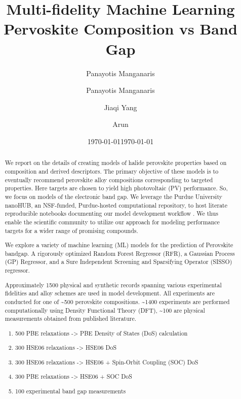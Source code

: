 \documentclass[aip, jmp, amsmath, amssymb]{revtex4-2}
\author{Panayotis Manganaris}
\date{\today}
\title{}
\begin{document}
\title{%
Multi-fidelity Machine Learning Pervoskite Composition vs Band Gap
}

\author{Panayotis Manganaris}
\author{Jiaqi Yang}
\author{Arun }

\date{\today}
\maketitle
\begin{abstract}
We report on the details of creating models of halide perovskite properties based on composition and derived
descriptors. The primary objective of these models is to eventually recommend perovskite alloy compositions
corresponding to targeted properties. Here targets are chosen to yield high photovoltaic (PV) performance. So, we focus
on models of the electronic band gap. We leverage the Purdue University nanoHUB, an NSF-funded, Purdue-hosted
computational repository, to host literate reproducible notebooks documenting our model development workflow
\cite{manganaris-2022-mrs-comput}. We thus enable the scientific community to utilize our approach for modeling
performance targets for a wider range of promising compounds.

We explore a variety of machine learning (ML) models for the prediction of Perovskite bandgap. A rigorously optimized
Random Forest Regressor (RFR), a Gaussian Process (GP) Regressor, and a Sure Independent Screening and Sparsifying
Operator\cite{ouyang-2018-sisso} (SISSO) regressor.

Approximately 1500 physical and synthetic records spanning various experimental fidelities and alloy schemes are used in
model development. All experiments are conducted for one of \textasciitilde{}500 perovskite compositions. \textasciitilde{}1400 experiments are
performed computationally using Density Functional Theory (DFT), \textasciitilde{}100 are physical measurements obtained from published
literature\cite{almora-2020-devic-perfor,jiang-2006-predic-lattic,briones-2021-accel-lattic}.

\begin{enumerate}
\item 500 PBE relaxations -> PBE Density of States (DoS) calculation
\item 300 HSE06 relaxations -> HSE06 DoS
\item 300 HSE06 relaxations -> HSE06 + Spin-Orbit Coupling (SOC) DoS
\item 300 PBE relaxations -> HSE06 + SOC DoS
\item 100 experimental band gap measurements
\end{enumerate}


\end{abstract}
\end{document}
